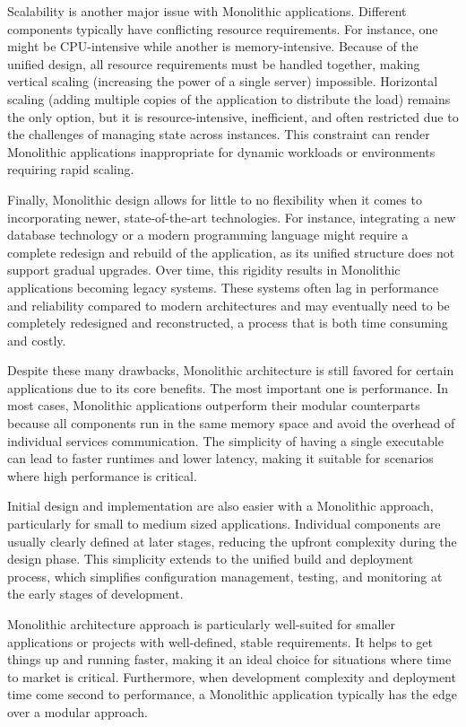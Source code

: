 Scalability is another major issue with Monolithic applications. Different components typically have conflicting resource requirements. For instance, one might be CPU-intensive while another is memory-intensive. Because of the unified design, all resource requirements must be handled together, making vertical scaling (increasing the power of a single server) impossible. Horizontal scaling (adding multiple copies of the application to distribute the load) remains the only option, but it is resource-intensive, inefficient, and often restricted due to the challenges of managing state across instances. This constraint can render Monolithic applications inappropriate for dynamic workloads or environments requiring rapid scaling. 

Finally, Monolithic design allows for little to no flexibility when it comes to incorporating newer, state-of-the-art technologies. For instance, integrating a new database technology or a modern programming language might require a complete redesign and rebuild of the application, as its unified structure does not support gradual upgrades. Over time, this rigidity results in Monolithic applications becoming legacy systems. These systems often lag in performance and reliability compared to modern architectures and may eventually need to be completely redesigned and reconstructed, a process that is both time consuming and costly. 

Despite these many drawbacks, Monolithic architecture is still favored for certain applications due to its core benefits. The most important one is performance. In most cases, Monolithic applications outperform their modular counterparts because all components run in the same memory space and avoid the overhead of individual services communication\cite{whatismono}. The simplicity of having a single executable can lead to faster runtimes and lower latency, making it suitable for scenarios where high performance is critical. 

Initial design and implementation are also easier with a Monolithic approach, particularly for small to medium sized applications. Individual components are usually clearly defined at later stages, reducing the upfront complexity during the design phase. This simplicity extends to the unified build and deployment process, which simplifies configuration management, testing, and monitoring at the early stages of development.

Monolithic architecture approach is particularly well-suited for smaller applications or projects with well-defined, stable requirements. It helps to get things up and running faster, making it an ideal choice for situations where time to market is critical. Furthermore, when development complexity and deployment time come second to performance, a Monolithic application typically has the edge over a modular approach.

